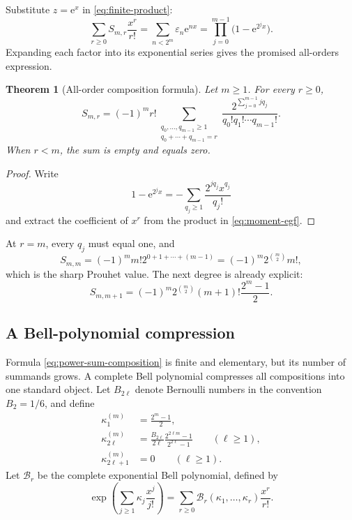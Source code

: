 \documentclass[11pt,oneside]{article}
\newtheorem{theorem}{Theorem}[section]
\theoremstyle{definition}
\theoremstyle{remark}
\newcommand{\e}{\mathrm e}
\newcommand{\Bell}{\mathcal B}
\begin{document}
Substitute \(z=\e^x\) in \eqref{eq:finite-product}:
\begin{equation}
 \sum_{r\ge0}S_{m,r}\frac{x^r}{r!}
 =\sum_{n<2^m}\varepsilon_n\e^{nx}
 =\prod_{j=0}^{m-1}\bigl(1-\e^{2^jx}\bigr).
 \label{eq:moment-egf}
\end{equation}
Expanding each factor into its exponential series gives the promised
all-orders expression.

\begin{theorem}[All-order composition formula]
\label{thm:power-sum-composition}
Let \(m\ge1\).  For every \(r\ge0\),
\begin{equation}
 \boxed{\quad
 S_{m,r}=(-1)^m r!
 \sum_{\substack{q_0,\ldots,q_{m-1}\ge1\\
                  q_0+\cdots+q_{m-1}=r}}
 \frac{2^{\sum_{j=0}^{m-1}jq_j}}
      {q_0!q_1!\cdots q_{m-1}!}.
 \quad}
 \label{eq:power-sum-composition}
\end{equation}
When \(r<m\), the sum is empty and equals zero.
\end{theorem}

\begin{proof}
Write
\begin{equation*}
 1-\e^{2^jx}=-\sum_{q_j\ge1}\frac{2^{jq_j}x^{q_j}}{q_j!}
\end{equation*}
and extract the coefficient of \(x^r\) from the product in
\eqref{eq:moment-egf}.
\end{proof}

At \(r=m\), every \(q_j\) must equal one, and
\begin{equation}
 S_{m,m}=(-1)^m m!2^{0+1+\cdots+(m-1)}
 =(-1)^m2^{\binom m2}m!,
 \label{eq:power-sum-sharp}
\end{equation}
which is the sharp Prouhet value.  The next degree is already explicit:
\begin{equation}
 S_{m,m+1}
 =(-1)^m2^{\binom m2}(m+1)!\frac{2^m-1}{2}.
 \label{eq:power-sum-next}
\end{equation}

\subsection{A Bell-polynomial compression}

Formula \eqref{eq:power-sum-composition} is finite and elementary, but its
number of summands grows.  A complete Bell polynomial compresses all
compositions into one standard object.  Let \(B_{2\ell}\) denote Bernoulli
numbers in the convention \(B_2=1/6\), and define
\begin{align}
 \kappa_1^{(m)}&=\frac{2^m-1}{2},
 \label{eq:kappa-one}\\
 \kappa_{2\ell}^{(m)}
 &=\frac{B_{2\ell}}{2\ell}
   \frac{2^{2\ell m}-1}{2^{2\ell}-1}
   \qquad(\ell\ge1),
 \label{eq:kappa-even}\\
 \kappa_{2\ell+1}^{(m)}&=0
   \qquad(\ell\ge1).
 \label{eq:kappa-odd}
\end{align}
Let \(\Bell_r\) be the complete exponential Bell polynomial, defined by
\begin{equation}
 \exp\!\left(\sum_{j\ge1}\kappa_j\frac{x^j}{j!}\right)
 =\sum_{r\ge0}\Bell_r(\kappa_1,\ldots,\kappa_r)\frac{x^r}{r!}.
 \label{eq:Bell-def}
\end{equation}
\end{document}
